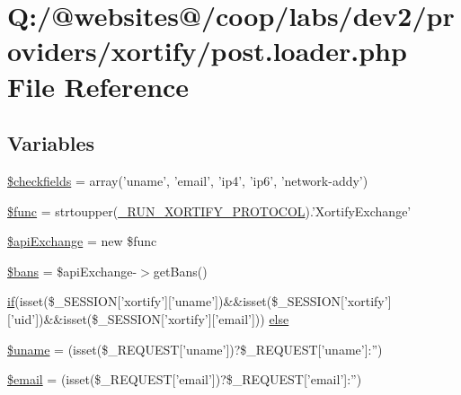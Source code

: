 \hypertarget{xortify_2post_8loader_8php}{\section{Q\-:/@websites@/coop/labs/dev2/providers/xortify/post.loader.\-php File Reference}
\label{xortify_2post_8loader_8php}
}
\subsection*{Variables}
\begin{DoxyCompactItemize}
\item 
\hyperlink{xortify_2post_8loader_8php_afaeb0aa23d13e417fcfa6b008f397c71}{\$checkfields} = array('uname', 'email', 'ip4', 'ip6', 'network-\/addy')
\item 
\hyperlink{xortify_2post_8loader_8php_aacfa30e81347998f3a6fd1903c2c05d3}{\$func} = strtoupper(\hyperlink{config_8php_aa8f158f551730a054a3adbdf9562e514}{\-\_\-\-R\-U\-N\-\_\-\-X\-O\-R\-T\-I\-F\-Y\-\_\-\-P\-R\-O\-T\-O\-C\-O\-L}).'Xortify\-Exchange'
\item 
\hyperlink{xortify_2post_8loader_8php_a46e5b84e3958fefa757e6c97dbfec560}{\$api\-Exchange} = new \$func
\item 
\hyperlink{xortify_2post_8loader_8php_a4e486549b335a8e8fe6eeb9c4aa0a17c}{\$bans} = \$api\-Exchange-\/$>$get\-Bans()
\item 
\hyperlink{index_8php_ae2ccdf355624402b65fc2226f2a661cd}{if}(isset(\$\-\_\-\-S\-E\-S\-S\-I\-O\-N\mbox{[}'xortify'\mbox{]}\mbox{[}'uname'\mbox{]})\&\&isset(\$\-\_\-\-S\-E\-S\-S\-I\-O\-N\mbox{[}'xortify'\mbox{]}\mbox{[}'uid'\mbox{]})\&\&isset(\$\-\_\-\-S\-E\-S\-S\-I\-O\-N\mbox{[}'xortify'\mbox{]}\mbox{[}'email'\mbox{]})) \hyperlink{xortify_2post_8loader_8php_a99f38b0c8c178a9286d03586510aa646}{else}
\item 
\hyperlink{xortify_2post_8loader_8php_a227a9443cabbe5e23cfc10c4371e09d1}{\$uname} = (isset(\$\-\_\-\-R\-E\-Q\-U\-E\-S\-T\mbox{[}'uname'\mbox{]})?\$\-\_\-\-R\-E\-Q\-U\-E\-S\-T\mbox{[}'uname'\mbox{]}\-:'')
\item 
\hyperlink{xortify_2post_8loader_8php_ad634f418b20382e2802f80532d76d3cd}{\$email} = (isset(\$\-\_\-\-R\-E\-Q\-U\-E\-S\-T\mbox{[}'email'\mbox{]})?\$\-\_\-\-R\-E\-Q\-U\-E\-S\-T\mbox{[}'email'\mbox{]}\-:'')
\end{DoxyCompactItemize}


